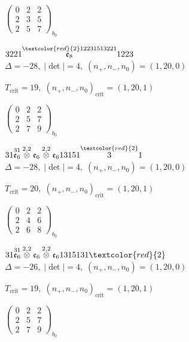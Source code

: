 \documentclass[10pt]{article}
\begin{document}
\hspace{2em}$\left(\begin{smallmatrix}0 & 2 & 2 \\ 2 & 3 & 5 \\ 2 & 5 & 7\end{smallmatrix}\right)_{\!b_0}$

$3221\overset{\textcolor{red}{2}12231513221}{\mathfrak{e}_8}1223$ \quad $\Delta=-28,\; |\det|=4,\; (n_+,n_-,n_0)=(1,20,0)$

\hspace{1em}$T_{\text{crit}}=19,\; (n_+,n_-,n_0)_{\text{crit}}=(1,20,1)$

\hspace{2em}$\left(\begin{smallmatrix}0 & 2 & 2 \\ 2 & 5 & 7 \\ 2 & 7 & 9\end{smallmatrix}\right)_{\!b_0}$

\smallskip

$31\overset{31}{\mathfrak{e}_6}\overset{2,2}{\otimes}\mathfrak{e}_6\overset{2,2}{\otimes}\mathfrak{e}_613151\overset{\textcolor{red}{2}}{3}1$ \quad $\Delta=-28,\; |\det|=4,\; (n_+,n_-,n_0)=(1,20,0)$

\hspace{1em}$T_{\text{crit}}=20,\; (n_+,n_-,n_0)_{\text{crit}}=(1,20,1)$

\hspace{2em}$\left(\begin{smallmatrix}0 & 2 & 2 \\ 2 & 4 & 6 \\ 2 & 6 & 8\end{smallmatrix}\right)_{\!b_0}$

$31\overset{31}{\mathfrak{e}_6}\overset{2,2}{\otimes}\mathfrak{e}_6\overset{2,2}{\otimes}\mathfrak{e}_61315131\textcolor{red}{2}$ \quad $\Delta=-26,\; |\det|=4,\; (n_+,n_-,n_0)=(1,20,0)$

\hspace{1em}$T_{\text{crit}}=19,\; (n_+,n_-,n_0)_{\text{crit}}=(1,20,1)$

\hspace{2em}$\left(\begin{smallmatrix}0 & 2 & 2 \\ 2 & 5 & 7 \\ 2 & 7 & 9\end{smallmatrix}\right)_{\!b_0}$
\end{document}
